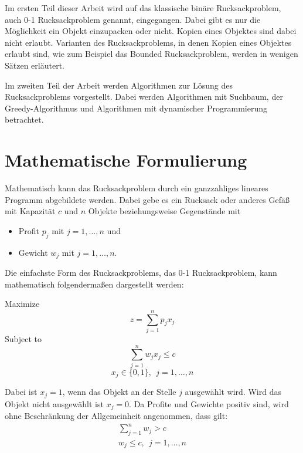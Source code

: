 Im ersten Teil dieser Arbeit wird auf das klassische binäre Rucksackproblem, auch 0-1 Rucksackproblem genannt, eingegangen. 
Dabei gibt es nur die Möglichkeit ein Objekt einzupacken oder nicht. Kopien eines Objektes sind dabei nicht erlaubt. Varianten des Rucksackproblems, in denen Kopien eines Objektes erlaubt sind, wie zum Beispiel das Bounded Rucksackproblem, werden in wenigen Sätzen erläutert.


Im zweiten Teil der Arbeit werden Algorithmen zur Lösung des Rucksackproblems vorgestellt.
Dabei werden Algorithmen mit Suchbaum, der Greedy-Algorithmus und Algorithmen mit dynamischer Programmierung betrachtet.

\chapter{Mathematische Formulierung}
Mathematisch kann das Rucksackproblem durch ein ganzzahliges lineares Programm abgebildete werden.
Dabei gebe es ein Rucksack oder anderes Gefäß mit Kapazität $c$ und $n$ Objekte beziehungsweise Gegenstände mit
\begin{itemize}
    \item Profit $p_j$ mit $j=1,\ldots,n$ und
    \item Gewicht $w_j$ mit $j=1,\ldots,n$.
\end{itemize}
Die einfachste Form des Rucksackproblems, das 0-1 Rucksackproblem, kann mathematisch folgendermaßen dargestellt werden: \cite[vgl.][]{Martello1987}

Maximize
\begin{equation}
z=\sum_{j=1}^{n}{p_jx_j} 
\end{equation}
Subject to 
\begin{equation} \label{eqn:subjectTo}
\sum_{j=1}^{n}{w_jx_j\le c}
\end{equation}
\begin{equation} \label{eqn:bedingung}
x_j\in\{0,1\},\ \ j=1,\ldots,n
\end{equation}

Dabei ist $x_j = 1$, wenn das Objekt an der Stelle $j$ ausgewählt wird. Wird das Objekt nicht ausgewählt ist $x_j = 0$. Da Profite und Gewichte positiv sind, wird ohne Beschränkung der Allgemeinheit angenommen, dass gilt: \cite[vgl.][]{Martello1987}
\begin{eqnarray}
\sum_{j=1}^{n}{w_j>c} \\
w_j\le c,\ \ j=1,\ldots,n
\end{eqnarray}



